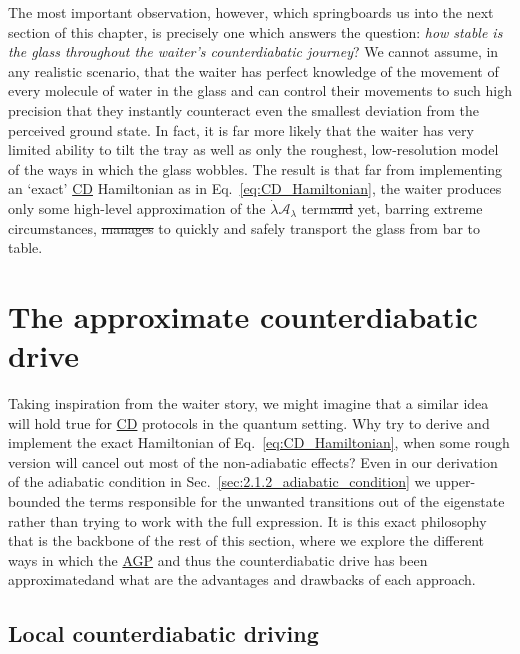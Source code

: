 \documentclass[a4paper,oneside,11pt]{book}
\newcommand{\AGP}[1]{\mathcal{A}_{#1}}
\newcommand{\dotlambda}{\dot{\lambda}}
\newcommand{\acrref}[1]{\hyperref[acr:#1]{#1}}
\providecommand{\DIFaddtex}[1]{{\protect\color{blue}\uwave{#1}}} %
\providecommand{\DIFdeltex}[1]{{\protect\color{red}\sout{#1}}}                      %
\providecommand{\DIFaddbegin}{} %
\providecommand{\DIFaddend}{} %
\providecommand{\DIFdelbegin}{} %
\providecommand{\DIFdelend}{} %
\providecommand{\DIFadd}[1]{\texorpdfstring{\DIFaddtex{#1}}{#1}} %
\providecommand{\DIFdel}[1]{\texorpdfstring{\DIFdeltex{#1}}{}} %
\newcommand{\DIFscaledelfig}{0.5}
\newlength{\DIFdelgraphicswidth} %
\newlength{\DIFdelgraphicsheight} %
\newcommand{\DIFaddincludegraphics}[2][]{{\color{blue}\fbox{\DIFOincludegraphics[#1]{#2}}}} %
\newcommand{\DIFdelincludegraphics}[2][]{%
\sbox{\DIFdelgraphicsbox}{\DIFOincludegraphics[#1]{#2}}%
\settoboxwidth{\DIFdelgraphicswidth}{\DIFdelgraphicsbox} %
\settoboxtotalheight{\DIFdelgraphicsheight}{\DIFdelgraphicsbox} %
\scalebox{\DIFscaledelfig}{%
\parbox[b]{\DIFdelgraphicswidth}{\usebox{\DIFdelgraphicsbox}\\[-\baselineskip] \rule{\DIFdelgraphicswidth}{0em}}\llap{\resizebox{\DIFdelgraphicswidth}{\DIFdelgraphicsheight}{%
\setlength{\unitlength}{\DIFdelgraphicswidth}%
\begin{picture}(1,1)%
\thicklines\linethickness{2pt} %
{\color[rgb]{1,0,0}\put(0,0){\framebox(1,1){}}}%
{\color[rgb]{1,0,0}\put(0,0){\line( 1,1){1}}}%
{\color[rgb]{1,0,0}\put(0,1){\line(1,-1){1}}}%
\end{picture}%
}\hspace*{3pt}}} %
} %
\DeclareRobustCommand{\DIFaddbegin}{\DIFOaddbegin \let\includegraphics\DIFaddincludegraphics} %
\DeclareRobustCommand{\DIFaddend}{\DIFOaddend \let\includegraphics\DIFOincludegraphics} %
\DeclareRobustCommand{\DIFdelbegin}{\DIFOdelbegin \let\includegraphics\DIFdelincludegraphics} %
\DeclareRobustCommand{\DIFdelend}{\DIFOaddend \let\includegraphics\DIFOincludegraphics} %
\begin{document}
\DIFaddend The most important observation, however, which springboards us into the next section of this chapter, is precisely one which answers the question: \emph{how stable is the glass throughout the waiter's counterdiabatic journey}? We cannot assume, in any realistic scenario, that the waiter has perfect knowledge of the movement of every molecule of water in the glass and can control their movements to such high precision that they instantly counteract even the smallest deviation from the perceived ground state. In fact, it is far more likely that the waiter has very limited ability to tilt the tray as well as only the roughest, low-resolution model of the ways in which the glass wobbles. The result is that far from implementing an `exact' \acrref{CD} Hamiltonian as in Eq.~\eqref{eq:CD_Hamiltonian}, the waiter produces only some high-level approximation of the $\dotlambda \AGP{\lambda}$ term\DIFdelbegin \DIFdel{and }\DIFdelend \DIFaddbegin \DIFadd{. And }\DIFaddend yet, barring extreme circumstances, \DIFdelbegin \DIFdel{manages }\DIFdelend \DIFaddbegin \DIFadd{they manage }\DIFaddend to quickly and safely transport the glass from bar to table. 

    \section{The approximate counterdiabatic drive}\label{sec:2.4_approximate_CD}

    Taking inspiration from the waiter story, we might imagine that a similar idea will hold true for \acrref{CD} protocols in the quantum setting. Why try to derive and implement the exact Hamiltonian of Eq.~\eqref{eq:CD_Hamiltonian}, when some rough version will cancel out most of the non-adiabatic effects? Even in our derivation of the adiabatic condition in Sec.~\ref{sec:2.1.2_adiabatic_condition} we upper-bounded the terms responsible for the unwanted transitions out of the eigenstate rather than trying to work with the full expression. It is this exact philosophy that is the backbone of the rest of this section, where we explore the different ways in which the \acrref{AGP} \DIFaddbegin \DIFadd{-- }\DIFaddend and thus the counterdiabatic drive \DIFaddbegin \DIFadd{-- }\DIFaddend has been approximated\DIFaddbegin \DIFadd{, }\DIFaddend and what are the advantages and drawbacks of each approach. 

    \subsection{Local counterdiabatic driving}\label{sec:2.4.1_LCD}
\end{document}
